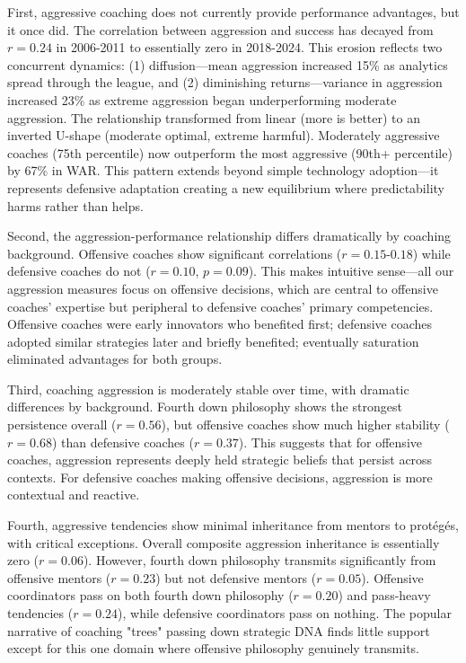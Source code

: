 \documentclass[11pt,twocolumn]{article}
\begin{document}
First, aggressive coaching does not currently provide performance advantages, but it once did. The correlation between aggression and success has decayed from $r=0.24$ in 2006-2011 to essentially zero in 2018-2024. This erosion reflects two concurrent dynamics: (1) diffusion---mean aggression increased 15\% as analytics spread through the league, and (2) diminishing returns---variance in aggression increased 23\% as extreme aggression began underperforming moderate aggression. The relationship transformed from linear (more is better) to an inverted U-shape (moderate optimal, extreme harmful). Moderately aggressive coaches (75th percentile) now outperform the most aggressive (90th+ percentile) by 67\% in WAR. This pattern extends beyond simple technology adoption---it represents defensive adaptation creating a new equilibrium where predictability harms rather than helps.

Second, the aggression-performance relationship differs dramatically by coaching background. Offensive coaches show significant correlations ($r=0.15$-$0.18$) while defensive coaches do not ($r=0.10$, $p=0.09$). This makes intuitive sense---all our aggression measures focus on offensive decisions, which are central to offensive coaches' expertise but peripheral to defensive coaches' primary competencies. Offensive coaches were early innovators who benefited first; defensive coaches adopted similar strategies later and briefly benefited; eventually saturation eliminated advantages for both groups.

Third, coaching aggression is moderately stable over time, with dramatic differences by background. Fourth down philosophy shows the strongest persistence overall ($r=0.56$), but offensive coaches show much higher stability ($r=0.68$) than defensive coaches ($r=0.37$). This suggests that for offensive coaches, aggression represents deeply held strategic beliefs that persist across contexts. For defensive coaches making offensive decisions, aggression is more contextual and reactive.

Fourth, aggressive tendencies show minimal inheritance from mentors to protégés, with critical exceptions. Overall composite aggression inheritance is essentially zero ($r=0.06$). However, fourth down philosophy transmits significantly from offensive mentors ($r=0.23$) but not defensive mentors ($r=0.05$). Offensive coordinators pass on both fourth down philosophy ($r=0.20$) and pass-heavy tendencies ($r=0.24$), while defensive coordinators pass on nothing. The popular narrative of coaching "trees" passing down strategic DNA finds little support except for this one domain where offensive philosophy genuinely transmits.
\end{document}
